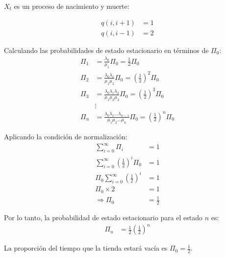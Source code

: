 \documentclass{article}
\begin{document}
$X_t$ es un proceso de nacimiento y muerte:

\begin{align*}
q(i, i+1) &= 1 \\
q(i, i-1) &= 2
\end{align*}

Calculando las probabilidades de estado estacionario en términos de $\Pi_0$:
\begin{align*}
\Pi_1 &= \frac{\lambda_0}{\mu_1} \Pi_0 = \frac{1}{2} \Pi_0 \\
\Pi_2 &= \frac{\lambda_0 \lambda_1}{\mu_1 \mu_2} \Pi_0 = \left(\frac{1}{2}\right)^2 \Pi_0 \\
\Pi_3 &= \frac{\lambda_0 \lambda_1 \lambda_2}{\mu_1 \mu_2 \mu_3} \Pi_0 = \left(\frac{1}{2}\right)^3 \Pi_0 \\
&\vdots \\
\Pi_n &= \frac{\lambda_0 \lambda_1 \dots \lambda_{n-1}}{\mu_1 \mu_2 \dots \mu_n} \Pi_0 = \left(\frac{1}{2}\right)^n \Pi_0
\end{align*}

Aplicando la condición de normalización:
\begin{align*}
\sum_{i=0}^{\infty} \Pi_i &= 1 \\
\sum_{i=0}^{\infty} \left(\frac{1}{2}\right)^i \Pi_0 &= 1 \\
\Pi_0 \sum_{i=0}^{\infty} \left(\frac{1}{2}\right)^i &= 1 \\
\Pi_0 \times 2 &= 1 \\
\Rightarrow \Pi_0 &= \frac{1}{2}
\end{align*}

Por lo tanto, la probabilidad de estado estacionario para el estado $n$ es:
\begin{align*}
\Pi_n &= \frac{1}{2} \left(\frac{1}{2}\right)^n
\end{align*}

La proporción del tiempo que la tienda estará vacía es $\Pi_0 = \frac{1}{2}$.
\end{document}
